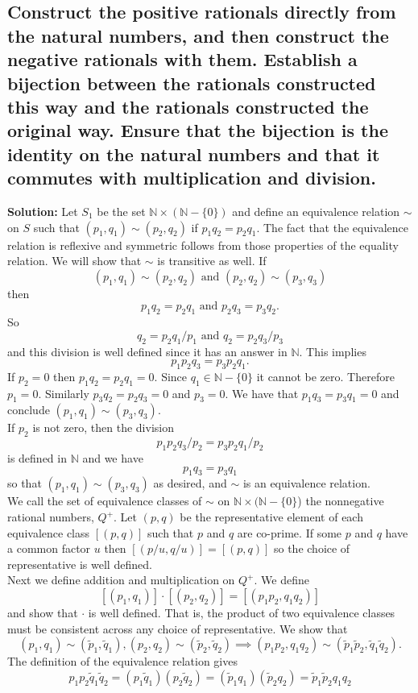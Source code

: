 \documentclass{article}
\newcommand{\exercise}[1]{\subsection{\normalfont #1}}
\newcommand{\solution}{\indent\indent \textbf{Solution: }}
\begin{document}
\exercise{Construct the positive rationals directly from the natural numbers, and then construct the negative rationals with them. Establish a bijection between the rationals constructed this way and the rationals constructed the original way. Ensure that the bijection is the identity on the natural numbers and that it commutes with multiplication and division.}
\solution 
Let $S_1$ be the set $\mathbb{N} \times (\mathbb{N} - \{0\})$ and define an equivalence relation $\sim$ on $S$ such that $ (p_1, q_1) \sim (p_2, q_2)$ if $p_1q_2 = p_2q_1$. The fact that the equivalence relation is reflexive and symmetric follows from those properties of the equality relation. We will show that $\sim$ is transitive as well. If
$$(p_1, q_1)\sim(p_2, q_2) \text{ and } (p_2, q_2) \sim (p_3, q_3)$$
then
$$p_1q_2 = p_2q_1 \text{ and } p_2q_3 = p_3q_2.$$
So
$$q_2 = p_2q_1/p_1 \text{ and } q_2 = p_2q_3/p_3$$
and this division is well defined since it has an answer in $\mathbb{N}$. This implies
$$p_1p_2q_3 = p_3p_2q_1.$$
If $p_2 = 0$ then $p_1q_2 = p_2q_1 = 0$. Since $q_1 \in \mathbb{N} - \{0\}$ it cannot be zero. Therefore $p_1 = 0.$ Similarly $p_3q_2 = p_2q_3 = 0$ and $p_3 = 0$. We have that $p_1q_3 = p_3q_1 = 0$ and conclude $(p_1, q_1) \sim (p_3, q_3)$. \\
\indent If $p_2$ is not zero, then the division 
$$p_1p_2q_3/p_2 = p_3p_2q_1/p_2$$
is defined in $\mathbb{N}$ and we have 
$$p_1q_3 = p_3q_1$$ 
so that $(p_1, q_1) \sim (p_3,  q_3)$ as desired, and $\sim$ is an equivalence relation.\\ 
\indent We call the set of equivalence classes of $\sim$ on $\mathbb{N} \times (\mathbb{N} - \{0\}$) the nonnegative rational numbers, $Q^+$. Let $(p, q)$ be the representative element of each equivalence class $[(p,q)]$ such that $p$ and $q$ are co-prime. If some $p$ and $q$ have a common factor $u$ then $[(p/u, q/u)] = [(p,q)]$ so the choice of representative is well defined. \\
\indent Next we define addition and multiplication on $Q^+$. We define 
$$[(p_1, q_1)] \cdot [(p_2, q_2)] = [(p_1p_2, q_1q_2)]$$
and show that $\cdot$ is well defined. That is, the product of two equivalence classes must be consistent across any choice of representative. We show that
$$(p_1, q_1) \sim (\tilde p_1, \tilde q_1), (p_2,  q_2) \sim (\tilde p_2, \tilde q_2) \implies (p_1p_2, q_1q_2) \sim (\tilde p_1\tilde p_2, \tilde q_1 \tilde q_2).$$ 
The definition of the equivalence relation gives 
$$p_1p_2\tilde q_1\tilde q_2 = (p_1\tilde q_1)(p_2\tilde q_2) = (\tilde p_1 q_1) (\tilde p_2 q_2) = \tilde p_1 \tilde p_2 q_1 q_2$$
\end{document}
